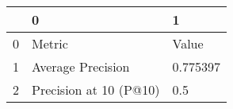 \begin{tabular}{lll}
\toprule
{} &                       0 &         1 \\
\midrule
0 &                  Metric &     Value \\
1 &       Average Precision &  0.775397 \\
2 &  Precision at 10 (P@10) &       0.5 \\
\bottomrule
\end{tabular}
